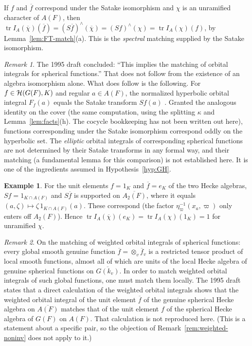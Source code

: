 \documentclass[12pt,letterpaper,openany]{book}
\theoremstyle{plain}
\theoremstyle{definition}
\newtheorem{example}[theorem]{Example}
\theoremstyle{remark}
\theoremstyle{remark}
\newtheorem{remyy}{Remark}
\newcommand{\tr}{\operatorname{tr}}
\begin{document}
If $f$ and $\overline f$ correspond under the Satake isomorphism and $\chi$ is
an unramified character of $A(F)$, then
$\tr I_A(\overline\chi)(\overline f)=(S\overline f)^\wedge(\overline\chi)
=(Sf)^\wedge(\chi)=\tr I_A(\chi)(f)$, by Lemma~\ref{lem:FT-match}(a).
This is the \emph{spectral} matching supplied by the Satake isomorphism.

\begin{remyy}\label{rem:satake-oi}
The 1995 draft concluded: ``This implies the matching of orbital
integrals for spherical functions.'' That does not follow from the
existence of an algebra isomorphism alone. What does follow is the
following. For $f\in{\cal H}(G(F),K)$ and regular $a\in A(F)$, the
normalized hyperbolic orbital integral $F_f(a)$ equals the Satake
transform $Sf(a)$ \cite{C}. Granted the analogous identity on the cover
(the same computation, using the splitting $\kappa$ and
Lemma~\ref{lem:facts}(h). The cocycle bookkeeping has not been written out
here), functions corresponding under the Satake isomorphism correspond
oddly on the hyperbolic set. The \emph{elliptic} orbital integrals of
corresponding spherical functions are not determined by their Satake
transforms in any formal way, and their matching (a fundamental lemma
for this comparison) is not established here. It is one of the
ingredients assumed in Hypothesis~\ref{hyp:GH}.
\end{remyy}

\begin{example}\label{ex:units}
For the unit elements $f=1_K$ and $\overline f=e_K$ of the two Hecke
algebras, $Sf=1_{K\cap A(F)}$ and $S\overline f$ is supported on
$\overline{A_2(F)}$, where it equals $(a,\zeta)\mapsto\zeta\,1_{K\cap A(F)}(a)$.
These correspond (the factor $\eta_\varpi^{-1}(x_a,\varpi)$ only enters off
$A_2(F)$). Hence $\tr I_A(\overline\chi)(e_K)=\tr I_A(\chi)(1_K)=1$ for
unramified $\chi$.
\end{example}

\begin{remyy}\label{rem:weighted-units}
On the matching of
weighted orbital integrals of spherical functions:
every global smooth genuine function
$\overline{f}=\otimes_v\overline{f}_v$ is a restricted tensor product
of local smooth functions, almost all of which are units of the
local Hecke algebra of genuine spherical functions on
$\overline{G(k_v)}$. In order to match weighted orbital integrals
of such global functions, one must match them locally.
The 1995 draft states that a direct calculation of the weighted orbital
integrals shows that the weighted orbital integral of the unit element
$\overline{f}$ of the genuine spherical Hecke algebra on $\overline{A(F)}$
matches that of the unit element $f$ of the spherical Hecke algebra of
$G(F)$ on $A(F)$. That calculation is not reproduced here. (This is a
statement about a specific pair, so the objection of
Remark~\ref{rem:weighted-noninv} does not apply to it.)
\end{remyy}
\end{document}
